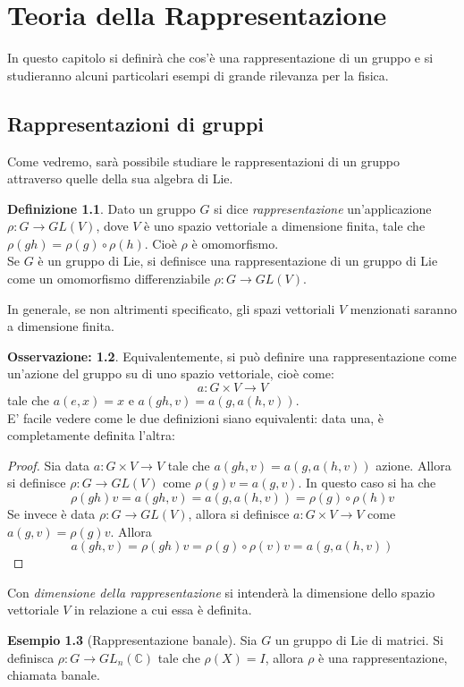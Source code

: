 \documentclass[12pt,a4paper]{report}
\theoremstyle{definition}
\newtheorem{Def}{Definizione}[chapter]
\theoremstyle{definition}
\newtheorem{Ex}[Def]{Esempio}
\theoremstyle{definition}
\theoremstyle{definition}
\newtheorem{Obs}[Def]{Osservazione:}
\begin{document}
\chapter{Teoria della Rappresentazione}
In questo capitolo si definirà che cos'è una rappresentazione di un gruppo e si studieranno alcuni particolari esempi di grande rilevanza per la fisica.
\section{Rappresentazioni di gruppi}
Come vedremo, sarà possibile studiare le rappresentazioni di un gruppo attraverso quelle della sua algebra di Lie.
\begin{Def}
Dato un gruppo $G$ si dice \textit{rappresentazione} un'applicazione\\ $\rho:G\rightarrow GL(V)$, dove $V$ è uno spazio vettoriale a dimensione finita, tale che $\rho(gh)=\rho(g)\circ\rho(h)$. Cioè $\rho$ è omomorfismo.\\
Se $G$ è un gruppo di Lie, si definisce una rappresentazione di un gruppo di Lie come un omomorfismo differenziabile $\rho:G\rightarrow GL(V)$.
\end{Def}
In generale, se non altrimenti specificato, gli spazi vettoriali $V$ menzionati saranno a dimensione finita.
\begin{Obs}
	Equivalentemente, si può definire una rappresentazione come un'azione del gruppo su di uno spazio vettoriale, cioè come:
	$$a:G\times V\rightarrow V$$
	tale che $a(e,x)=x$ e $a(gh,v)=a(g,a(h,v))$.\\
	E' facile vedere come le due definizioni siano equivalenti: data una, è completamente definita l'altra:
	\begin{proof}
		Sia data $a:G\times V\rightarrow V$
		tale che $a(gh,v)=a(g,a(h,v))$ azione. Allora si definisce $\rho:G\rightarrow GL(V)$ come $\rho(g)v=a(g,v)$. In questo caso si ha che $$\rho(gh)v=a(gh,v)=a(g,a(h,v))=\rho(g)\circ\rho(h)v$$
		Se invece è data $\rho:G\rightarrow GL(V)$, allora si definisce $a:G\times V\rightarrow V$ come $a(g,v)=\rho(g)v$. Allora $$a(gh,v)=\rho(gh)v=\rho(g)\circ\rho(v)v=a(g,a(h,v))$$
	\end{proof}
\end{Obs}
Con \textit{dimensione della rappresentazione} si intenderà la dimensione dello spazio vettoriale $V$ in relazione a cui essa è definita.
\begin{Ex}[Rappresentazione banale]
	Sia $G$ un gruppo di Lie di matrici. Si definisca $\rho: G\rightarrow GL_n(\mathbb{C})$ tale che $\rho(X)=I$, allora $\rho$ è una rappresentazione, chiamata banale. 
\end{Ex}
\end{document}

